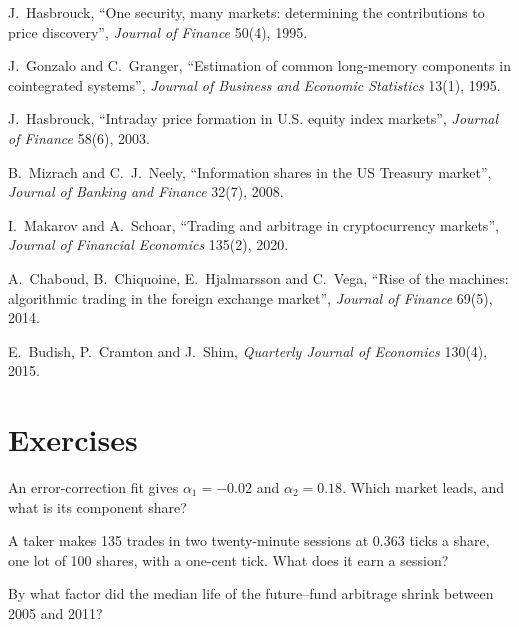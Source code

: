 \begin{omsources}
\item J.~Hasbrouck, ``One security, many markets: determining the contributions to price discovery'', \emph{Journal of Finance} 50(4), 1995.
\item J.~Gonzalo and C.~Granger, ``Estimation of common long-memory components in cointegrated systems'', \emph{Journal of Business and Economic
Statistics} 13(1), 1995.
\item J.~Hasbrouck, ``Intraday price formation in U.S. equity index markets'', \emph{Journal of Finance} 58(6), 2003.
\item B.~Mizrach and C.~J.~Neely, ``Information shares in the US Treasury market'', \emph{Journal of Banking and Finance} 32(7), 2008.
\item I.~Makarov and A.~Schoar, ``Trading and arbitrage in cryptocurrency markets'', \emph{Journal of Financial Economics} 135(2), 2020.
\item A.~Chaboud, B.~Chiquoine, E.~Hjalmarsson and C.~Vega, ``Rise of the machines: algorithmic trading in the foreign exchange market'',
\emph{Journal of Finance} 69(5), 2014.
\item E.~Budish, P.~Cramton and J.~Shim, \emph{Quarterly Journal of Economics} 130(4), 2015.
\end{omsources}

\section{Exercises}

\begin{exercise}[$\star$]\label{exo:hf:lead-lag-and-cross-venue-trading:1}
An error-correction fit gives $\alpha_1=-0.02$ and $\alpha_2=0.18$. Which market leads, and what is its component share?
\end{exercise}

\begin{exercise}[$\star$]\label{exo:hf:lead-lag-and-cross-venue-trading:2}
A taker makes 135 trades in two twenty-minute sessions at 0.363 ticks a share, one lot of 100 shares, with a one-cent tick. What does it earn a
session?
\end{exercise}

\begin{exercise}[$\star$]\label{exo:hf:lead-lag-and-cross-venue-trading:3}
By what factor did the median life of the future--fund arbitrage shrink between 2005 and 2011?
\end{exercise}

